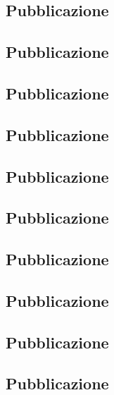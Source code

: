 \documentclass{article}
\begin{document}
\center \subsection{Pubblicazione}
\newpage


\center \subsection{Pubblicazione}
\newpage


\center \subsection{Pubblicazione}
\newpage


\center \subsection{Pubblicazione}
\newpage


\center \subsection{Pubblicazione}
\newpage


\center \subsection{Pubblicazione}
\newpage


\center \subsection{Pubblicazione}
\newpage


\center \subsection{Pubblicazione}
\newpage


\center \subsection{Pubblicazione}
\newpage


\center \subsection{Pubblicazione}
\newpage

\end{document}

